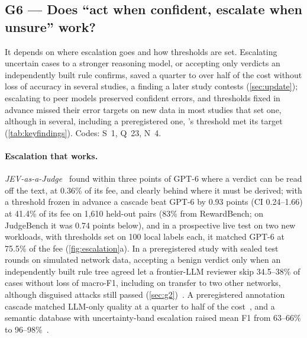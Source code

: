 \subsection{G6 --- Does ``act when confident, escalate when unsure'' work?}
\label{sec:g6}

\begin{answerbox}
It depends on where escalation goes and how thresholds are set.
Escalating uncertain cases to a stronger reasoning model, or accepting only verdicts an independently built rule confirms, saved a quarter to over half of the cost without loss of accuracy in several studies, a finding a later study contests (\cref{sec:update}); escalating to peer models preserved confident errors, and thresholds fixed in advance missed their error targets on new data in most studies that set one, although in several, including a preregistered one, \jev{}'s threshold met its target (\cref{tab:keyfindings}).
Codes: S~1, Q~23, N~4.
\end{answerbox}

\paragraph{Escalation that works.}
\emph{JEV-as-a-Judge}~\cite{arx26550} found \jev{} within three points of GPT-6 where a verdict can be read off the text, at 0.36\% of its fee, and clearly behind where it must be derived; with a threshold frozen in advance a cascade beat GPT-6 by 0.93 points (CI 0.24--1.66) at 41.4\% of its fee on 1{,}610 held-out pairs (83\% from RewardBench; on JudgeBench it was 0.74 points below), and in a prospective live test on two new workloads, with thresholds set on 100 local labels each, it matched GPT-6 at 75.5\% of the fee (\cref{fig:escalation}a).
In a preregistered study with sealed test rounds on simulated network data, accepting a benign \jev{} verdict only when an independently built rule tree agreed let a frontier-LLM reviewer skip 34.5--38\% of cases without loss of macro-F1, including on transfer to two other networks, although disguised attacks still passed (\cref{sec:g2})~\cite{arx02048}.
A preregistered annotation cascade matched LLM-only quality at a quarter to half of the cost~\cite{arx24574}, and a semantic database with uncertainty-band escalation raised mean F1 from 63--66\% to 96--98\%~\cite{arx02046}.

